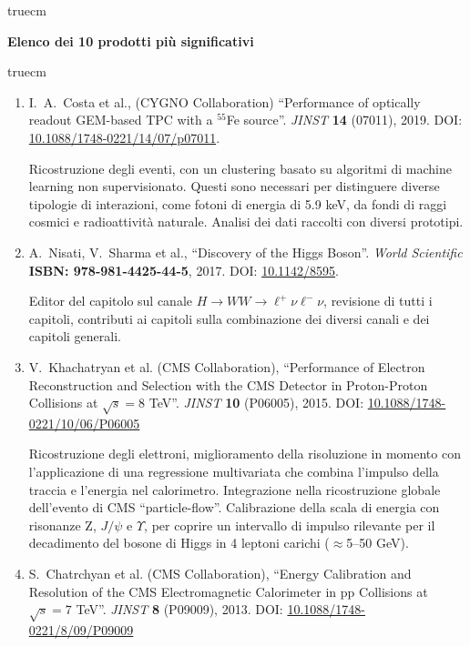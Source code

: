 \documentclass[11pt,twoside,a4paper]{article}
\begin{document}
 truecm
\begin{center}
{\bf{Elenco dei 10 prodotti pi\`u significativi}}
\end{center}
 truecm

\begin{enumerate}

\item I.~A.~Costa et al., (CYGNO Collaboration) ``Performance of
  optically readout GEM-based TPC with a $^{55}$Fe
  source''. \textit{JINST} \textbf{14} (07011), 2019. DOI:
  \href{https://iopscience.iop.org/article/10.1088/1748-0221/14/07/P07011}{10.1088/1748-0221/14/07/p07011}.

  Ricostruzione degli eventi, con un clustering basato su algoritmi
  di machine learning non supervisionato.  Questi sono necessari per
  distinguere diverse tipologie di interazioni, come fotoni di
  energia di 5.9 keV, da fondi di raggi cosmici e radioattivit\`a
  naturale. Analisi dei dati raccolti con diversi prototipi.

\item A.~Nisati, V.~Sharma et al., ``Discovery of the Higgs
  Boson''. \textit{World Scientific} \textbf{ISBN:
    978-981-4425-44-5}, 2017. DOI:
  \href{https://www.worldscientific.com/worldscibooks/10.1142/8595}{10.1142/8595}.

  Editor del capitolo sul canale $H\to WW\to\ell^+\nu\ell^-\nu$,
  revisione di tutti i capitoli, contributi ai capitoli sulla
  combinazione dei diversi canali e dei capitoli generali.

\item V.~Khachatryan et al. (CMS Collaboration), ``Performance of
  Electron Reconstruction and Selection with the CMS Detector in
  Proton-Proton Collisions at $\sqrt{s} = 8$ TeV''. \textit{JINST}
  \textbf{10} (P06005), 2015. DOI:
  \href{https://iopscience.iop.org/article/10.1088/1748-0221/10/06/P06005}{10.1088/1748-0221/10/06/P06005}
  
  Ricostruzione degli elettroni, miglioramento della risoluzione in
  momento con l'applicazione di una regressione multivariata che
  combina l'impulso della traccia e l'energia nel
  calorimetro. Integrazione nella ricostruzione globale dell'evento
  di CMS ``particle-flow''. Calibrazione della scala di energia con
  risonanze Z, $J/\psi$ e $\Upsilon$, per coprire un intervallo di
  impulso rilevante per il decadimento del bosone di Higgs in 4
  leptoni carichi ($\approx$5--50 GeV).

\item S.~Chatrchyan et al. (CMS Collaboration), ``Energy Calibration
  and Resolution of the CMS Electromagnetic Calorimeter in pp
  Collisions at $\sqrt{s} = 7$ TeV''. \textit{JINST} \textbf{8}
  (P09009), 2013. DOI:
  \href{https://iopscience.iop.org/article/10.1088/1748-0221/8/09/P09009/meta}{10.1088/1748-0221/8/09/P09009}


\end{enumerate}
\end{document}
